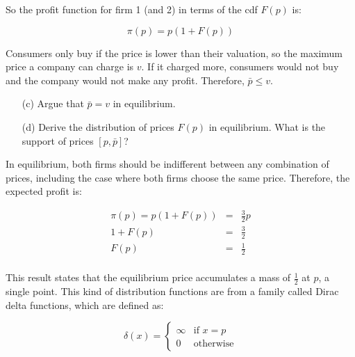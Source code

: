 \begin{myanswerbox}
    So the profit function for firm 1 (and 2) in terms of the cdf $F(p)$ is:

    \begin{equation*}
        \pi(p) = p \left(1 +  F(p) \right)
    \end{equation*}

    Consumers only buy if the price is lower than their valuation, so the maximum price a company can charge is \( v \). If it charged more, consumers would not buy and the company would not make any profit. Therefore, \( \bar{p} \leq v \).
\end{myanswerbox}


\begin{tcolorbox}
    \begin{enumerate}
        \item[(c)] Argue that $\bar{p} = v$ in equilibrium.
        \item[(d)] Derive the distribution of prices $F(p)$ in equilibrium. What is the support of prices $[p, \bar{p}]$?
    \end{enumerate}
\end{tcolorbox}

In equilibrium, both firms should be indifferent between any combination of prices, including the case where both firms choose the same price. Therefore, the expected profit is:

\begin{eqnarray*}
    \pi(p) = p \left(1 +  F(p) \right) &=& \frac{3}{2} p\\
    1 +  F(p) &=& \frac{3}{2}\\
    F(p) &=& \frac{1}{2}\\
\end{eqnarray*}

This result states that the equilibrium price accumulates a mass of \( \frac{1}{2} \) at \( p \), a single point. This kind of distribution functions are from a family called Dirac delta functions, which are defined as:

\begin{equation*}
    \delta(x) = 
    \begin{cases}
        \infty & \text{if } x = p\\
        0 & \text{otherwise}
    \end{cases}
\end{equation*}

